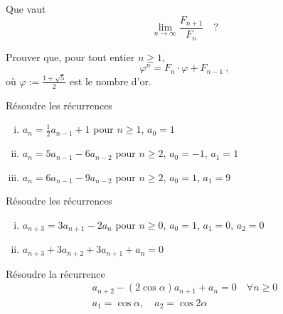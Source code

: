 \begin{exo} 
Que vaut
\[
\lim_{n \to \infty} \frac{F_{n+1}}{F_n} \quad ?
\]
\end{exo}


\begin{exo} 
Prouver que, pour tout entier $n \geqslant 1$, 
\[
\varphi^n = F_n \cdot \varphi + F_{n-1}\ ,
\]
o\`u $\varphi := \frac{1+\sqrt{5}}{2}$ est le {\DEF nombre d'or}.
\end{exo}


\begin{exo}
R\'esoudre les r\'ecurrences 
%
\begin{enumerate}[(i)]
\item $a_n = \frac{1}{2} a_{n-1} + 1$ pour $n \geqslant 1$,\hfill
 $a_0 = 1$

\item $a_n = 5a_{n-1} - 6a_{n-2}$ pour $n \geqslant 2$,\hfill
 $a_0 = -1$, \quad $a_1 = 1$

\item $a_n = 6a_{n-1} - 9a_{n-2}$ pour $n \geqslant 2$,\hfill
 $a_0 = 1$, \quad $a_1 = 9$

\end{enumerate}
\end{exo}


\begin{exo}
R\'esoudre les r\'ecurrences 
%
\begin{enumerate}[(i)]

\item $a_{n+3} = 3 a_{n+1} - 2 a_{n}$ pour $n \geqslant 0$,\hfill
      $a_0 = 1$, \quad $a_1 = 0$, \quad $a_2 = 0$
      
\item $a_{n+3} + 3 a_{n+2} + 3 a_{n+1} + a_n = 0$

\end{enumerate}
\end{exo}


\begin{exo}
R\'esoudre la r\'ecurrence
\[
\begin{array}{ll}
a_{n+2} - (2 \cos \alpha) a_{n+1} + a_n = 0\quad \forall n \geqslant 0\\
a_1 = \cos \alpha, \quad a_2 = \cos 2 \alpha
\end{array}
\]
\end{exo}

